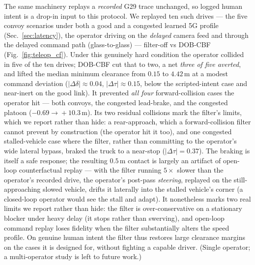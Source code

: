 \documentclass[conference,letterpaper,10pt]{IEEEtran}
\begin{document}
The same machinery replays a \emph{recorded} G29 trace unchanged, so logged
human intent is a drop-in input to this protocol. We replayed ten such drives
--- the five convoy scenarios under both a good and a congested learned 5G
profile (Sec.~\ref{sec:latency}), the operator driving on the \emph{delayed}
camera feed and through the delayed command path (glass-to-glass) --- filter-off
vs DOB-CBF (Fig.~\ref{fig:teleop_cf}). Under this genuinely hard condition the
operator collided in five of the ten drives; DOB-CBF cut that to two, a net
\emph{three of five averted}, and lifted the median minimum clearance from
$0.15$ to $4.42\,$m at a modest command deviation
($|\Delta\delta|\!\approx\!0.04$, $|\Delta\tau|\!\approx\!0.15$, below the
scripted-intent case and near-inert on the good link). It prevented \emph{all
four} forward-collision cases the operator hit --- both convoys, the congested
lead-brake, and the congested platoon ($-0.69\!\to\!+10.3\,$m). Its two residual
collisions mark the filter's limits, which we report rather than hide: a
rear-approach, which a forward-collision filter cannot prevent by construction
(the operator hit it too), and one congested stalled-vehicle case where the
filter, rather than committing to the operator's wide lateral bypass, braked the
truck to a near-stop ($|\Delta\tau|\!=\!0.37$). The braking is itself a safe
response; the resulting $0.5\,$m contact is largely an artifact of open-loop
counterfactual replay --- with the filter running $5\times$ slower than the
operator's recorded drive, the operator's post-pass \emph{steering}, replayed on
the still-approaching slowed vehicle, drifts it laterally into the stalled
vehicle's corner (a closed-loop operator would see the stall and adapt). It
nonetheless marks two real limits we report rather than hide: the filter is
over-conservative on a stationary blocker under heavy delay (it stops rather
than swerving), and open-loop command replay loses fidelity when the filter
substantially alters the speed profile. On genuine human intent the filter thus
restores large clearance margins on the cases it is designed for, without
fighting a capable driver. (Single operator; a multi-operator study is left to
future work.)
\end{document}
